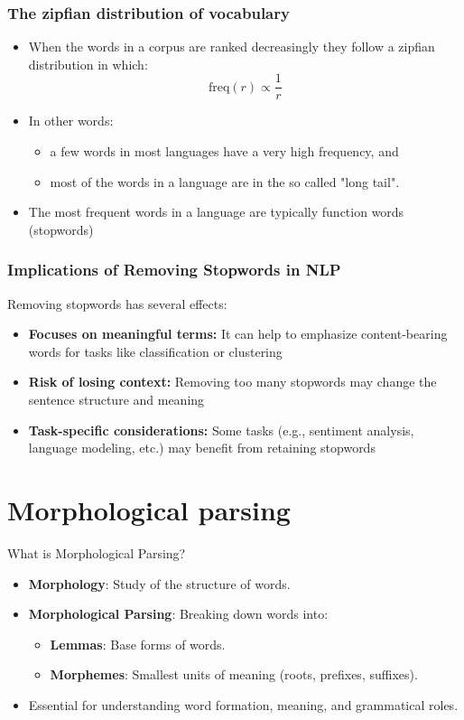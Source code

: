 \documentclass{beamer}
\begin{document}
\begin{frame}
\frametitle{The zipfian distribution of vocabulary}

\begin{itemize}
    \item When the words in a corpus are ranked decreasingly they follow a zipfian distribution in which:
    \[
      \mathrm{freq}(r) \propto \frac{1}{r}
    \]
    \item In other words:
    \begin{itemize}
        \item a few words in most languages have a very high frequency, and
        \item most of the words in a language are in the so called "long tail".
    \end{itemize}
    \item The most frequent words in a language are typically function words (stopwords)
\end{itemize}
\end{frame}


\begin{frame}
\frametitle{Implications of Removing Stopwords in NLP}

Removing stopwords has several effects:

\begin{itemize}
    \item \textbf{Focuses on meaningful terms:} It can help to emphasize content-bearing words for tasks like classification or clustering
    \item \textbf{Risk of losing context:} Removing too many stopwords may change the sentence structure and meaning
    \item \textbf{Task-specific considerations:} Some tasks (e.g., sentiment analysis, language modeling, etc.) may benefit from retaining stopwords
\end{itemize}
\end{frame}

\section{Morphological parsing}

\begin{frame}{What is Morphological Parsing?}
    \begin{itemize}
        \item \textbf{Morphology}: Study of the structure of words.
        \item \textbf{Morphological Parsing}: Breaking down words into:
        \begin{itemize}
            \item \textbf{Lemmas}: Base forms of words.
            \item \textbf{Morphemes}: Smallest units of meaning (roots, prefixes, suffixes).
        \end{itemize}
        \item Essential for understanding word formation, meaning, and grammatical roles.
    \end{itemize}
\end{frame}
\end{document}
